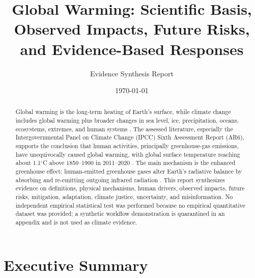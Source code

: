 \documentclass[12pt]{article}
\title{\textbf{Global Warming: Scientific Basis, Observed Impacts, Future Risks, and Evidence-Based Responses}}
\author{Evidence Synthesis Report}
\date{\today}
\begin{document}
\onehalfspacing
\maketitle

\begin{abstract}
Global warming is the long-term heating of Earth's surface, while climate change includes global warming plus broader changes in sea level, ice, precipitation, oceans, ecosystems, extremes, and human systems \cite{ref2}. The assessed literature, especially the Intergovernmental Panel on Climate Change (IPCC) Sixth Assessment Report (AR6), supports the conclusion that human activities, principally greenhouse-gas emissions, have unequivocally caused global warming, with global surface temperature reaching about 1.1$^\circ$C above 1850--1900 in 2011--2020 \cite{ref1}. The main mechanism is the enhanced greenhouse effect: human-emitted greenhouse gases alter Earth's radiative balance by absorbing and re-emitting outgoing infrared radiation \cite{ref3,ref4,ref5}. This report synthesizes evidence on definitions, physical mechanisms, human drivers, observed impacts, future risks, mitigation, adaptation, climate justice, uncertainty, and misinformation. No independent empirical statistical test was performed because no empirical quantitative dataset was provided; a synthetic workflow demonstration is quarantined in an appendix and is not used as climate evidence.
\end{abstract}

\section*{Executive Summary}
\end{document}
